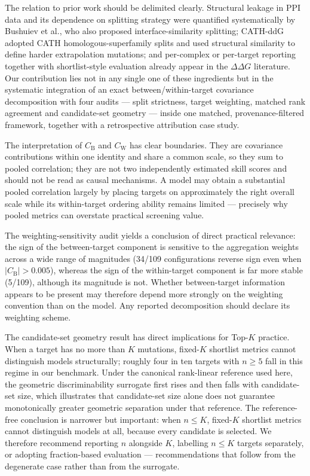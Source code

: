 \documentclass[11pt,a4paper]{article}
\begin{document}
The relation to prior work should be delimited clearly. Structural leakage in PPI data and
its dependence on splitting strategy were quantified systematically by Bushuiev et al., who
also proposed interface-similarity splitting\cite{leakage}; CATH-ddG adopted CATH
homologous-superfamily splits and used structural similarity to define harder extrapolation
mutations\cite{cathddg}; and per-complex or per-target reporting together with
shortlist-style evaluation already appear in the $\Delta\Delta G$
literature\cite{ddgpred,prefolddg,ppiminer}. Our contribution lies not in any single one of these
ingredients but in the systematic integration of an exact between/within-target covariance
decomposition with four audits --- split strictness, target weighting, matched rank
agreement and candidate-set geometry --- inside one matched, provenance-filtered framework,
together with a retrospective attribution case study.

The interpretation of $C_{\mathrm{B}}$ and $C_{\mathrm{W}}$ has clear boundaries. They are
covariance contributions within one identity and share a common scale, so they sum to pooled
correlation; they are not two independently estimated skill scores and should not be read as
causal mechanisms. A model may obtain a substantial pooled correlation largely by placing
targets on approximately the right overall scale while its within-target ordering ability
remains limited --- precisely why pooled metrics can overstate practical screening value.

The weighting-sensitivity audit yields a conclusion of direct practical relevance: the sign
of the between-target component is sensitive to the aggregation weights across a wide range
of magnitudes (34/109 configurations reverse sign even when $|C_{\mathrm{B}}| > 0.005$),
whereas the sign of the within-target component is far more stable (5/109), although
its magnitude is not. Whether between-target information appears to be present may
therefore depend more strongly on the weighting convention than on the model. Any reported
decomposition should declare its weighting scheme.

The candidate-set geometry result has direct implications for Top-$K$ practice. When a
target has no more than $K$ mutations, fixed-$K$ shortlist metrics cannot distinguish models
structurally; roughly four in ten targets with $n \geq 5$ fall in this regime in our
benchmark. Under the canonical rank-linear reference used here, the geometric discriminability
surrogate first rises and then falls with candidate-set size, which illustrates that
candidate-set size alone does not guarantee monotonically greater geometric separation
under that reference. The reference-free conclusion is narrower but important: when
$n \leq K$, fixed-$K$ shortlist metrics cannot distinguish models at all, because every
candidate is selected. We therefore recommend reporting $n$ alongside $K$, labelling
$n \leq K$ targets separately, or adopting fraction-based evaluation --- recommendations
that follow from the degenerate case rather than from the surrogate.
\end{document}
